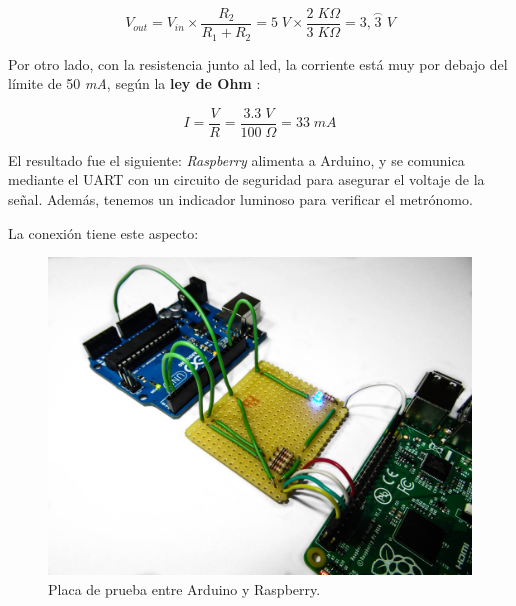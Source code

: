 \begin{equation}
	V_{out} = V_{in} \times \frac{R_2}{R_1 + R_2} = 5 \; V \times \frac{2 \; K\Omega}{3 \; K\Omega} = 3,\stackrel{\frown}{3} \; V
\end{equation}

\smallskip

Por otro lado, con la resistencia junto al \acrshort{led}, la corriente está muy por debajo del límite de 50 \textit{mA}, según la \textbf{ley de Ohm} \cite{wiki_ohm}:

\smallskip

\begin{equation}
	I = \frac{V}{R} = \frac{3.3 \; V}{100 \; \Omega} = 33 \; mA
\end{equation}

\smallskip

El resultado fue el siguiente: \textit{Raspberry} alimenta a Arduino, y se comunica mediante el \acrshort{UART} con un circuito de seguridad para asegurar el voltaje de la señal. Además, tenemos un indicador luminoso para verificar el metrónomo.

La conexión tiene este aspecto:

\smallskip

\begin{figure}[H]
	\noindent \begin{centering}
		\includegraphics[width=\linewidth*3/4]{capitulo6/proto_uart}
		\par\end{centering}
	\smallskip
	\caption{\label{fig:proto_uart} Placa de prueba entre Arduino y Raspberry.}
\end{figure} 

